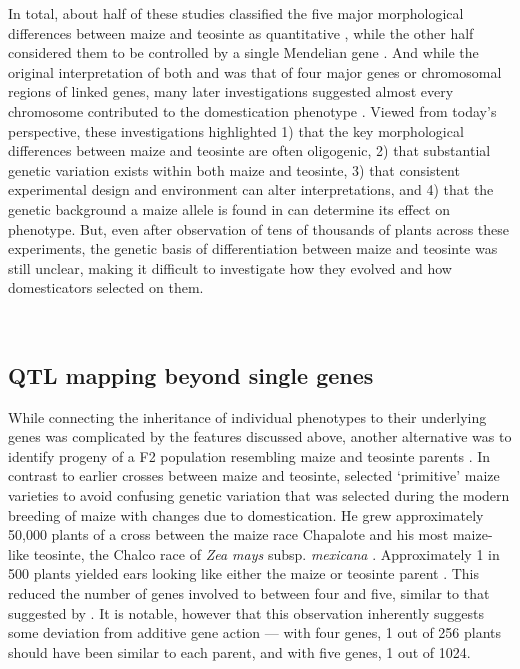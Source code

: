 \documentclass[a4paper]{article}
\begin{document}
﻿In total, about half of these studies classified the five major morphological differences between maize and teosinte as quantitative  \citep{collins1920, mangelsdorf1947, rogers1950a, rogers1950b}, while the other half considered them to be controlled by a single Mendelian gene \citep{langham1940, galinat1971, galinat1988}.
﻿And while the original interpretation of both \citet{mangelsdorf1939} and \citet{beadle1939} was that of four major genes or chromosomal regions of linked genes, many later investigations suggested almost every chromosome contributed to the domestication phenotype \citep{mangelsdorf1947, rogers1950a, rogers1950b}.
Viewed from today's perspective, these investigations highlighted 1) that the key morphological differences between maize and teosinte are often oligogenic, 2) that substantial genetic variation exists within both maize and teosinte, 3) that consistent experimental design and environment can alter interpretations, and 4) that the genetic background a maize allele is found in can determine its effect on phenotype.
But, even after observation of tens of thousands of plants across these experiments, the genetic basis of differentiation between maize and teosinte was still unclear, making it difficult to investigate how they evolved and how domesticators selected on them.

﻿\subsection*{QTL mapping beyond single genes}

﻿While connecting the inheritance of individual phenotypes to their underlying genes was complicated by the features discussed above, another alternative was to identify progeny of a F2 population resembling maize and teosinte parents \citep{beadle1972}.
In  contrast to earlier crosses between maize and teosinte, \citet{beadle1972} selected `primitive' maize varieties to avoid confusing genetic variation that was selected during the modern breeding of maize with changes due to domestication.
He grew approximately 50,000 plants of a cross between the maize race Chapalote and his most maize-like teosinte, the Chalco race of \textit{Zea mays} subsp. \textit{mexicana} \citep{beadle1972, beadle1980}.
Approximately 1 in 500 plants yielded ears looking like either the maize or teosinte parent \citep{beadle1972, beadle1980}.
This reduced the number of genes involved to between four and five, similar to that suggested by \citet{langham1940}.
It is notable, however that this observation inherently suggests some deviation from additive gene action --- with four genes, 1 out of 256 plants should have been similar to each parent, and with five genes, 1 out of 1024.
\end{document}

